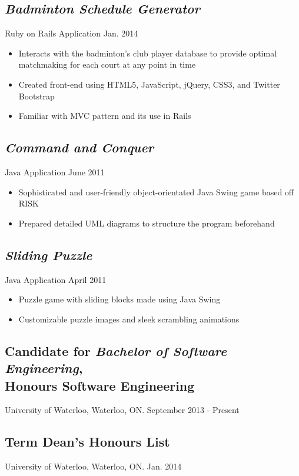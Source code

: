 \documentclass[10pt]{article}
\begin{document}
\begin{minipage}[t]{0.83\linewidth}
	\subsection*{\textit{Badminton Schedule Generator}} \vspace{-6pt} 
		Ruby on Rails Application \hspace{222pt} Jan. 2014
		\begin{itemize}
			\item Interacts with the badminton's club player database to provide optimal matchmaking for each court at any point in time 
			\item Created front-end using HTML5, JavaScript, jQuery, CSS3, and Twitter Bootstrap
			\item Familiar with MVC pattern and its use in Rails
		\end{itemize}	
	
	\subsection*{\textit{Command and Conquer}} \vspace{-6pt}
		Java Application \hspace{263pt} June 2011
		\begin{itemize}
			\item Sophisticated and user-friendly object-orientated Java Swing game based off RISK
			\item Prepared detailed UML diagrams to structure the program beforehand
		\end{itemize}

	\subsection*{\textit{Sliding Puzzle}} \vspace{-6pt}
		Java Application \hspace{260pt} April 2011
		\begin{itemize}
			\item Puzzle game with sliding blocks made using Java Swing
			\item Customizable puzzle images and sleek scrambling animations
		\end{itemize}
	
	\subsection*{Candidate for \textit{Bachelor of Software Engineering}, \\Honours Software Engineering} 								\vspace{-6pt}
		University of Waterloo, Waterloo, ON. \hspace{100pt} September 2013 - Present

	\subsection*{Term Dean's Honours List} 								\vspace{-6pt}
		University of Waterloo, Waterloo, ON. \hspace{165pt} Jan. 2014
\end{minipage}
\end{document}
